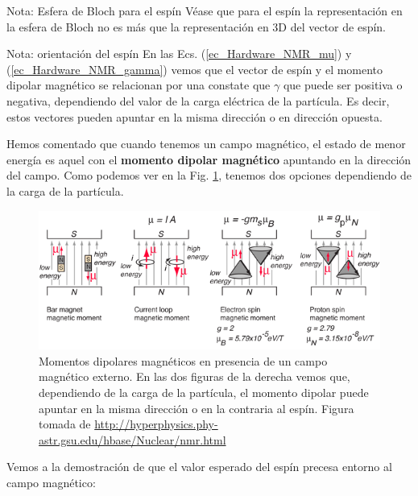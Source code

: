 \documentclass[a4paper,11pt]{book} %
\numberwithin{equation}{chapter}
\begin{document}
	\begin{mybox_blue}{Nota: Esfera de Bloch para el espín}
	Véase que para el espín la representación en la esfera de Bloch no es más que la representación 
	en 3D del vector de espín. 	
	\end{mybox_blue}

	\begin{mybox_blue}{Nota: orientación del espín}
	En las Ecs. (\ref{ec_Hardware_NMR_mu}) y (\ref{ec_Hardware_NMR_gamma}) vemos que el vector de espín
	y el momento dipolar magnético se relacionan por una constate que $\gamma$ que puede ser positiva o 
	negativa, dependiendo del valor de la carga eléctrica de la partícula. Es decir, estos vectores pueden 
	apuntar en la misma dirección o en dirección opuesta. 

	\vspace{0.3cm}	
	Hemos comentado que cuando tenemos un campo magnético, el
	estado de menor energía es aquel con el \textbf{momento dipolar magnético} apuntando en la dirección 
	del campo. Como podemos ver en la Fig. \ref{Fig_Hardware_NMR_espines_en_B}, tenemos dos opciones 
	dependiendo de la carga de la partícula.
		\begin{figure}[H]
		\centering 
		\includegraphics[width=1\linewidth]{Figuras/Fig_Hardware_NMR_espines_en_B.png}
		\caption{Momentos dipolares magnéticos en presencia de un campo magnético externo. En las dos figuras
		de la derecha vemos que, dependiendo de la carga de la partícula, el momento dipolar puede apuntar 
		en la misma dirección o en la contraria al espín. Figura tomada de 
		\url{http://hyperphysics.phy-astr.gsu.edu/hbase/Nuclear/nmr.html}}
		\label{Fig_Hardware_NMR_espines_en_B}
		\end{figure}
	\end{mybox_blue}


Vemos a la demostración de que el valor esperado del espín precesa entorno al campo magnético:
\end{document}
